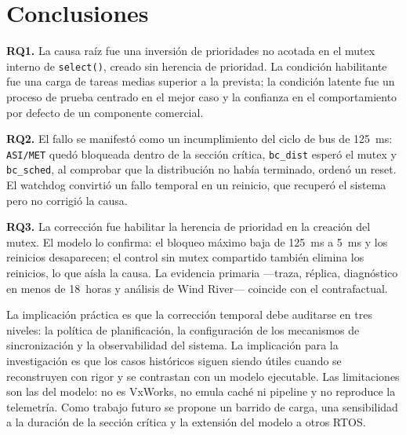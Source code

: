 \documentclass[journal]{IEEEtran}
\begin{document}
\section{Conclusiones}
\label{sec:conclusiones}

\textbf{RQ1.} La causa raíz fue una inversión de prioridades no acotada en el mutex interno de \texttt{select()}, creado sin herencia de prioridad. La condición habilitante fue una carga de tareas medias superior a la prevista; la condición latente fue un proceso de prueba centrado en el mejor caso y la confianza en el comportamiento por defecto de un componente comercial.

\textbf{RQ2.} El fallo se manifestó como un incumplimiento del ciclo de bus de 125~ms: \texttt{ASI/MET} quedó bloqueada dentro de la sección crítica, \texttt{bc\_dist} esperó el mutex y \texttt{bc\_sched}, al comprobar que la distribución no había terminado, ordenó un reset. El watchdog convirtió un fallo temporal en un reinicio, que recuperó el sistema pero no corrigió la causa.

\textbf{RQ3.} La corrección fue habilitar la herencia de prioridad en la creación del mutex. El modelo lo confirma: el bloqueo máximo baja de 125~ms a 5~ms y los reinicios desaparecen; el control sin mutex compartido también elimina los reinicios, lo que aísla la causa. La evidencia primaria ---traza, réplica, diagnóstico en menos de 18~horas y análisis de Wind River--- coincide con el contrafactual.

La implicación práctica es que la corrección temporal debe auditarse en tres niveles: la política de planificación, la configuración de los mecanismos de sincronización y la observabilidad del sistema. La implicación para la investigación es que los casos históricos siguen siendo útiles cuando se reconstruyen con rigor y se contrastan con un modelo ejecutable. Las limitaciones son las del modelo: no es VxWorks, no emula caché ni pipeline y no reproduce la telemetría. Como trabajo futuro se propone un barrido de carga, una sensibilidad a la duración de la sección crítica y la extensión del modelo a otros RTOS.



\end{document}
